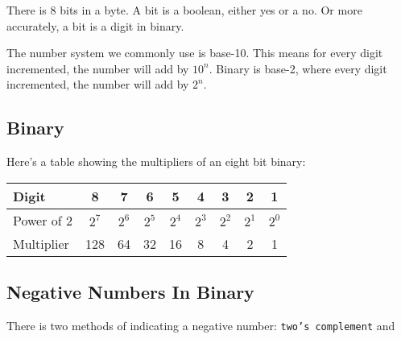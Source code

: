 \documentclass[../notes.tex]{subfiles}
\begin{document}
There is 8 bits in a byte.
A bit is a boolean, either yes or a no.
Or more accurately, a bit is a digit in binary.

The number system we commonly use is base-10.
This means for every digit incremented, the number will add by $10^n$.
Binary is base-2, where every digit incremented, the number will add by $2^n$.

\subsection{Binary}
Here's a table showing the multipliers of an eight bit binary:
\begin{tabular}{|l|c|c|c|c|c|c|c|c|}
	\hline
	Digit      & 8     & 7     & 6     & 5     & 4     & 3     & 2     & 1 \\
	\hline
	Power of 2 & $2^7$ & $2^6$ & $2^5$ & $2^4$ & $2^3$ & $2^2$ & $2^1$ & $2^0$ \\
	\hline
	Multiplier & 128   & 64    & 32    & 16    & 8     & 4     & 2     & 1 \\
	\hline
\end{tabular}

\subsection{Negative Numbers In Binary}

There is two methods of indicating a negative number: \texttt{two's complement} and \texttt{}
\end{document}
